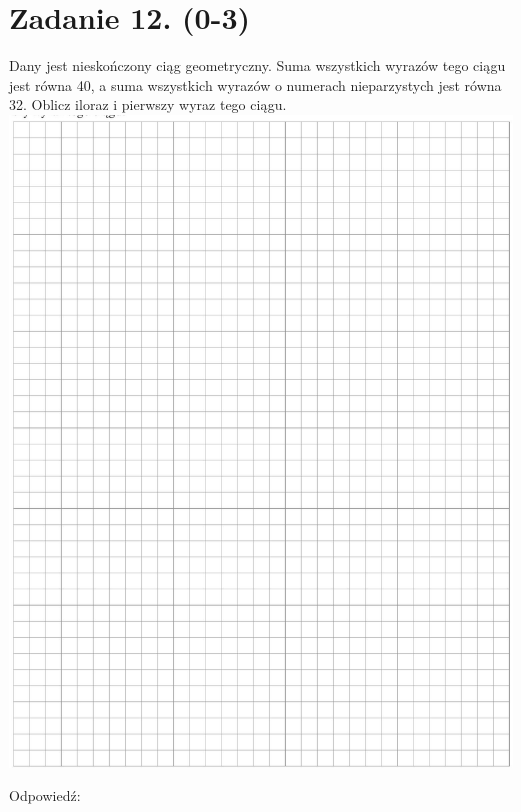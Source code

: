 \documentclass[10pt]{article}
\begin{document}
\section*{Zadanie 12. (0-3)}
Dany jest nieskończony ciąg geometryczny. Suma wszystkich wyrazów tego ciągu jest równa 40, a suma wszystkich wyrazów o numerach nieparzystych jest równa 32. Oblicz iloraz i pierwszy wyraz tego ciągu.\\
\includegraphics[max width=\textwidth, center]{2024_11_21_c0ca116654784d42326bg-09}

Odpowiedź: \(\qquad\)
\end{document}
